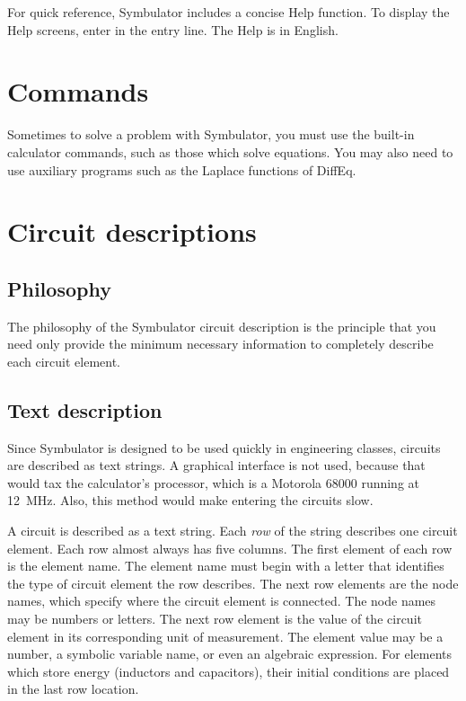 For quick reference, Symbulator includes a concise Help function. To
display the Help screens, enter  in the entry
line. The Help is in English.

\section{Commands}

Sometimes to solve a problem with Symbulator, you must use the
built-in calculator commands, such as those which solve equations.
You may also need to use auxiliary programs such as the Laplace
functions of DiffEq.

\section{Circuit descriptions}

\subsection{Philosophy}

The philosophy of the Symbulator circuit description is the
principle that you need only provide the minimum necessary
information to completely describe each circuit element.

\subsection{Text description}

Since Symbulator is designed to be used quickly in engineering
classes, circuits are described as text strings. A graphical
interface is not used, because that would tax the calculator's
processor, which is a Motorola 68000 running at 12~MHz. Also, this
method would make entering the circuits slow.

A circuit is described as a text string. Each \emph{row} of the
string describes one circuit element. Each row almost always has
five columns. The first element of each row is the element name. The
element name must begin with a letter that identifies the type of
circuit element the row describes. The next row elements are the
node names, which specify where the circuit element is connected.
The node names may be numbers or letters. The next row element is
the value of the circuit element in its corresponding unit of
measurement. The element value may be a number, a symbolic variable
name, or even an algebraic expression. For elements which store
energy (inductors and capacitors), their initial conditions are
placed in the last row location.

